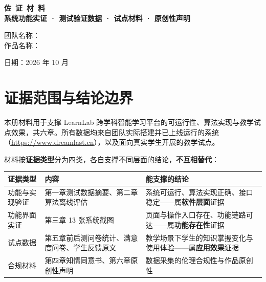 \documentclass[zihao=-4,a4paper,UTF8,fontset=windows]{ctexart}
\begin{document}
\begin{titlepage}
\thispagestyle{cover}
\vspace*{2.8cm}
\begin{center}
{\bfseries{} 佐\ 证\ 材\ 料}\\[1.2em]
{\bfseries{} 系统功能实证 · 测试验证数据 · 试点材料 · 原创性声明}\\[3em]
\end{center}
\vspace{4em}
\begin{flushleft}
\hspace*{4em}
团队名称：\underline{}\\[0.8em]
\hspace*{4em}作品名称：\underline{}\\
\end{flushleft}
\vfill
\begin{center} 日期：2026 年 10 月\end{center}
\vspace*{1.5cm}
\end{titlepage}
\setcounter{page}{1}

\section{证据范围与结论边界}

本册材料用于支撑 LearnLab 跨学科智能学习平台的可运行性、算法实现与教学试点效果，共六章。所有数据均来自团队实际搭建并已上线运行的系统（\url{https://www.dreamlast.cn}），以及面向真实学生开展的教学试点。

材料按\textbf{证据类型}分为四类，各自支撑不同层面的结论，\textbf{不互相替代}：

\par\noindent\begin{tabular}{|p{3.0cm}|p{5.2cm}|p{5.4cm}|}
\hline
\textbf{证据类型} & \textbf{内容} & \textbf{能支撑的结论} \\ \hline
功能与实现验证 & 第一章测试数据摘要、第二章算法离线评估 & 系统可运行、算法实现正确、接口稳定——属\textbf{软件层面}证据 \\ \hline
功能界面实证 & 第三章 13 张系统截图 & 页面与操作入口存在、功能链路可达——属\textbf{功能存在性}证据 \\ \hline
试点数据 & 第五章前后测问卷统计、满意度问卷、学生反馈原文 & 教学场景下学生的知识掌握变化与使用体验——属\textbf{应用效果}证据 \\ \hline
合规材料 & 第四章知情同意书、第六章原创性声明 & 数据采集的伦理合规性与作品原创性 \\ \hline
\end{tabular}\par
\end{document}
